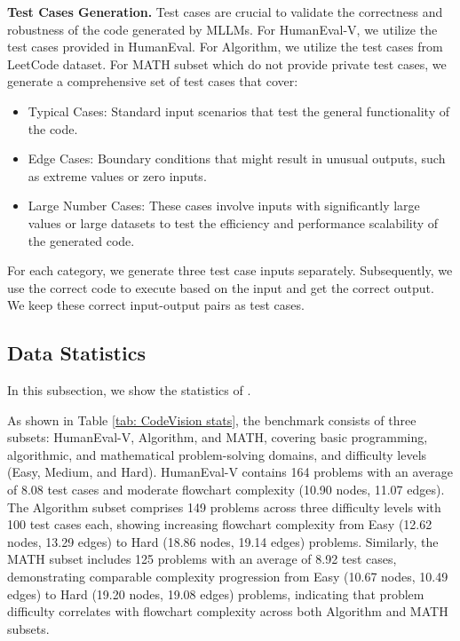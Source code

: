 \textbf{Test Cases Generation. }
Test cases are crucial to validate the correctness and robustness of the code generated by MLLMs. For HumanEval-V, we utilize the test cases provided in HumanEval. For Algorithm, we utilize the test cases from LeetCode dataset\cite{guo2024deepseekcoderlargelanguagemodel}. For MATH subset which do not provide private test cases, we generate a comprehensive set of test cases that cover:
\begin{itemize}
    \item Typical Cases: Standard input scenarios that test the general functionality of the code.
    \item Edge Cases: Boundary conditions that might result in unusual outputs, such as extreme values or zero inputs.
    \item Large Number Cases: These cases involve inputs with significantly large values or large datasets to test the efficiency and performance scalability of the generated code. 
\end{itemize}

For each category, we generate three test case inputs separately. Subsequently, we use the correct code to execute based on the input and get the correct output. We keep these correct input-output pairs as test cases.





\subsection{Data Statistics}\label{dataset:sta}
In this subsection, we show the statistics of \benchmark.


As shown in Table \ref{tab: CodeVision stats}, the \benchmark benchmark consists of three subsets: HumanEval-V, Algorithm, and MATH, covering basic programming, algorithmic, and mathematical problem-solving domains, and difficulty levels (Easy, Medium, and Hard). HumanEval-V contains 164 problems with an average of 8.08 test cases and moderate flowchart complexity (10.90 nodes, 11.07 edges). The Algorithm subset comprises 149 problems across three difficulty levels with 100 test cases each, showing increasing flowchart complexity from Easy (12.62 nodes, 13.29 edges) to Hard (18.86 nodes, 19.14 edges) problems. Similarly, the MATH subset includes 125 problems with an average of 8.92 test cases, demonstrating comparable complexity progression from Easy (10.67 nodes, 10.49 edges) to Hard (19.20 nodes, 19.08 edges) problems, indicating that problem difficulty correlates with flowchart complexity across both Algorithm and MATH subsets.


